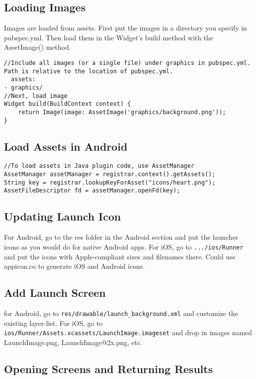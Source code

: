 \documentclass{article}
\begin{document}
\subsection{Loading Images}
Images are loaded from assets. First put the images in a directory you specify in pubspec.yml. Then load them in the Widget's build method with the AssetImage() method. 

\begin{verbatim}
//Include all images (or a single file) under graphics in pubspec.yml. Path is relative to the location of pubspec.yml.
  assets:
- graphics/
//Next, load image
Widget build(BuildContext context) {
	return Image(image: AssetImage('graphics/background.png'));
}

\end{verbatim}

\subsection{Load Assets in Android}
\begin{lstlisting}
//To load assets in Java plugin code, use AssetManager
AssetManager assetManager = registrar.context().getAssets();
String key = registrar.lookupKeyForAsset("icons/heart.png");
AssetFileDescriptor fd = assetManager.openFd(key);

\end{lstlisting}

\subsection{Updating Launch Icon}
For Android, go to the res folder in the Android section and put the launcher icons as you would do for native Android apps. For iOS, go to \lstinline{.../ios/Runner} and put the icons with Apple-compliant sizes and filenames there. Could use appicon.co to generate iOS and Android icons. 

\subsection{Add Launch Screen}
for Android, go to \lstinline{res/drawable/launch_background.xml} and customize the existing layer-list. For iOS, go to \lstinline{ios/Runner/Assets.xcassets/LaunchImage.imageset} and drop in images named LaunchImage.png, LaunchImage@2x.png, etc. 


\subsection{Opening Screens and Returning Results}
\end{document}
